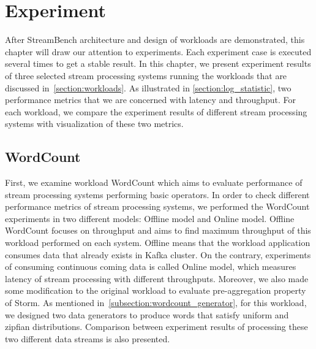 \chapter{Experiment}
\label{chapter:experiment}

After StreamBench architecture and design of workloads are demonstrated, this chapter will draw our attention to experiments. Each experiment case is executed several times to get a stable result. In this chapter, we present experiment results of three selected stream processing systems running the workloads that are discussed in~\cref{section:workloads}. As illustrated in \cref{section:log_statistic}, two performance metrics that we are concerned with latency and throughput. For each workload, we compare the experiment results of different stream processing systems with visualization of these two metrics. 

\section{WordCount}
\label{section:wordcount_experiment}

First, we examine workload WordCount which aims to evaluate performance of stream processing systems performing basic operators. In order to check different performance metrics of stream processing systems, we performed the WordCount experiments in two different models: Offline model and Online model. Offline WordCount focuses on throughput and aims to find maximum throughput of this workload performed on each system. Offline means that the workload application consumes data that already exists in Kafka cluster. On the contrary, experiments of consuming continuous coming data is called Online model, which measures latency of stream processing with different throughputs. Moreover, we also made some modification to the original workload to evaluate pre-aggregation property of Storm.  As mentioned in~\cref{subsection:wordcount_generator}, for this workload, we designed two data generators to produce words that satisfy uniform and zipfian distributions. Comparison between experiment results of processing these two different data streams is also presented. 


